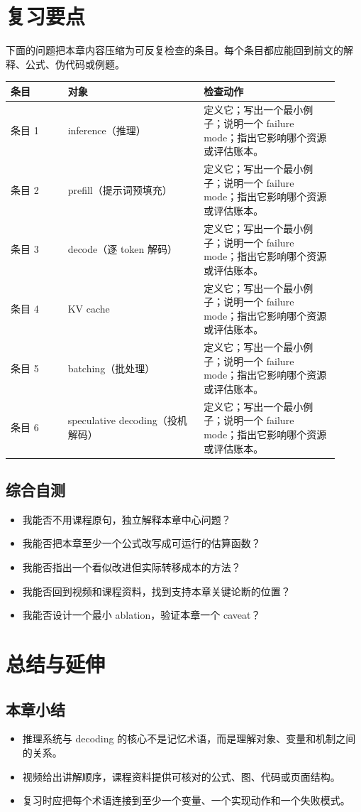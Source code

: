 \documentclass[a4paper]{article}
\begin{document}
\section{复习要点}
下面的问题把本章内容压缩为可反复检查的条目。每个条目都应能回到前文的解释、公式、伪代码或例题。
\begin{longtable}{p{0.16\linewidth}p{0.38\linewidth}p{0.38\linewidth}}
\toprule
\textbf{条目} & \textbf{对象} & \textbf{检查动作}\\
\midrule
条目 1 & inference（推理） & 定义它；写出一个最小例子；说明一个 failure mode；指出它影响哪个资源或评估账本。\\
条目 2 & prefill（提示词预填充） & 定义它；写出一个最小例子；说明一个 failure mode；指出它影响哪个资源或评估账本。\\
条目 3 & decode（逐 token 解码） & 定义它；写出一个最小例子；说明一个 failure mode；指出它影响哪个资源或评估账本。\\
条目 4 & KV cache & 定义它；写出一个最小例子；说明一个 failure mode；指出它影响哪个资源或评估账本。\\
条目 5 & batching（批处理） & 定义它；写出一个最小例子；说明一个 failure mode；指出它影响哪个资源或评估账本。\\
条目 6 & speculative decoding（投机解码） & 定义它；写出一个最小例子；说明一个 failure mode；指出它影响哪个资源或评估账本。\\
\bottomrule
\end{longtable}
\subsection{综合自测}
\begin{itemize}
\item 我能否不用课程原句，独立解释本章中心问题？
\item 我能否把本章至少一个公式改写成可运行的估算函数？
\item 我能否指出一个看似改进但实际转移成本的方法？
\item 我能否回到视频和课程资料，找到支持本章关键论断的位置？
\item 我能否设计一个最小 ablation，验证本章一个 caveat？
\end{itemize}
\section{总结与延伸}
\subsection{本章小结}
\begin{itemize}
\item 推理系统与 decoding 的核心不是记忆术语，而是理解对象、变量和机制之间的关系。
\item 视频给出讲解顺序，课程资料提供可核对的公式、图、代码或页面结构。
\item 复习时应把每个术语连接到至少一个变量、一个实现动作和一个失败模式。
\end{itemize}
\end{document}
